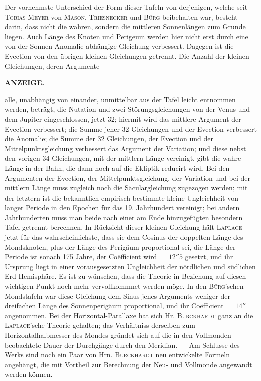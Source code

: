 Der vornehmste Unterschied der Form dieser Tafeln von derjenigen, welche seit \textsc{Tobias Meyer} von \textsc{Mason}, \textsc{Triesnecker} und \textsc{Bürg} beibehalten war, besteht darin, dass nicht die wahren, sondern die mittleren Sonnenlängen zum Grunde liegen. Auch Länge des Knoten und Perigeum werden hier nicht erst durch eine von der Sonnen-Anomalie abhängige Gleichung verbessert. Dagegen ist die Evection von den übrigen kleinen Gleichungen getrennt. Die Anzahl der kleinen Gleichungen, deren Argumente\par
{}
\clearpage
\thispagestyle{empty}
\noindent{}%
%
\parbox[t]{\dimexpr\linewidth-24mm\relax}{\centering\footnotesize\bfseries ANZEIGE.\par}%
\makebox[12mm][r]{}\par\medskip
\noindent alle, unabhängig von einander, unmittelbar aus der Tafel leicht entnommen werden, beträgt, die Nutation und zwei Störungsgleichungen von der Venus und dem Jupiter eingeschlossen, jetzt 32; hiermit wird das mittlere Argument der Evection verbessert; die Summe jener 32 Gleichungen und der Evection verbessert die Anomalie; die Summe der 32 Gleichungen, der Evection und der Mittelpunktsgleichung verbessert das Argument der Variation; und diese nebst den vorigen 34 Gleichungen, mit der mittlern Länge vereinigt, gibt die wahre Länge in der Bahn, die dann noch auf die Ekliptik reducirt wird. Bei den Argumenten der Evection, der Mittelpunktsgleichung, der Variation und bei der mittlern Länge muss zugleich noch die Säculargleichung zugezogen werden; mit der letztern ist die bekanntlich empirisch bestimmte kleine Ungleichheit von langer Periode in den Epochen für das 19. Jahrhundert vereinigt; bei andern Jahrhunderten muss man beide nach einer am Ende hinzugefügten besondern Tafel getrennt berechnen. In Rücksicht dieser kleinen Gleichung hält \textsc{Laplace} jetzt für das wahrscheinlichste, dass sie dem Cosinus der doppelten Länge des Mondsknoten, plus der Länge des Perigäum proportional sei, die Länge der Periode ist sonach 175 Jahre, der Coëfficient wird $= 12''5$ gesetzt, und ihr Ursprung liegt in einer vorausgesetzten Ungleichheit der nördlichen und südlichen Erd-Hemisphäre. Es ist zu wünschen, dass die Theorie in Beziehung auf diesen wichtigen Punkt noch mehr vervollkommnet werden möge. In den \textsc{Bürg}'schen Mondstafeln war diese Gleichung dem Sinus jenes Arguments weniger der dreifachen Länge des Sonnenperigäum proportional, und ihr Coëfficient $= 14''$ angenommen. Bei der Horizontal-Parallaxe hat sich Hr. \textsc{Burckhardt} ganz an die \textsc{Laplace}'sche Theorie gehalten; das Verhältniss derselben zum Horizontalhalbmesser des Mondes gründet sich auf die in den Vollmonden beobachtete Dauer der Durchgänge durch den Meridian. --- Am Schlusse des Werks sind noch ein Paar von Hrn. \textsc{Burckhardt} neu entwickelte Formeln angehängt, die mit Vortheil zur Berechnung der Neu- und Vollmonde angewandt werden können.
